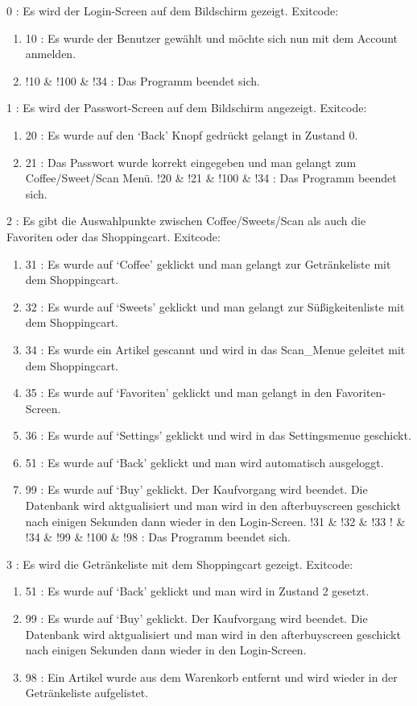 \documentclass[11pt,a4paper]{article} %
\begin{document}
		0 : Es wird der Login-Screen auf dem Bildschirm gezeigt.
			Exitcode: 
\begin{enumerate}
			\item	10 : Es wurde der Benutzer gewählt und möchte sich nun mit dem Account anmelden.
			\item	!10 \& !100 \& !34 : Das Programm beendet sich.
\end{enumerate}
		1 : Es wird der Passwort-Screen auf dem Bildschirm angezeigt.
			Exitcode:
\begin{enumerate}			
			\item	20 : Es wurde auf den `Back' Knopf gedrückt gelangt in Zustand 0.
			\item	21 : Das Passwort wurde korrekt eingegeben und man gelangt zum Coffee/Sweet/Scan Menü.
				!20 \& !21 \& !100 \& !34 : Das Programm beendet sich.
\end{enumerate}			
		2 : Es gibt die Auswahlpunkte zwischen Coffee/Sweets/Scan als auch die Favoriten oder das Shoppingcart.
			Exitcode:
\begin{enumerate}			
			\item	31 : Es wurde auf `Coffee' geklickt und man gelangt zur Getränkeliste mit dem Shoppingcart.
			\item	32 : Es wurde auf `Sweets' geklickt und man gelangt zur Süßigkeitenliste mit dem Shoppingcart.
			\item	34 : Es wurde ein Artikel gescannt und wird in das Scan\_Menue geleitet mit dem Shoppingcart.
			\item	35 : Es wurde auf `Favoriten' geklickt und man gelangt in den Favoriten-Screen.
			\item	36 : Es wurde auf `Settings' geklickt und wird in das Settingsmenue geschickt.
			\item	51 : Es wurde auf `Back' geklickt und man wird automatisch ausgeloggt.
			\item	99 : Es wurde auf `Buy' geklickt. Der Kaufvorgang wird beendet. Die Datenbank wird aktgualisiert und man wird in den afterbuyscreen geschickt nach einigen 						Sekunden dann wieder in den Login-Screen.
				!31 \& !32 \& !33 ! \& !34 \& !99 \& !100 \& !98 : Das Programm beendet sich.
\end{enumerate}			
		3 : Es wird die Getränkeliste mit dem Shoppingcart gezeigt.
			Exitcode:
\begin{enumerate}			
			\item	51 : Es wurde auf `Back' geklickt und man wird in Zustand 2 gesetzt.
			\item	99 : Es wurde auf `Buy' geklickt. Der Kaufvorgang wird beendet. Die Datenbank wird aktgualisiert und man wird in den afterbuyscreen geschickt nach einigen 						Sekunden dann wieder in den Login-Screen.
			\item	98 : Ein Artikel wurde aus dem Warenkorb entfernt und wird wieder in der Getränkeliste aufgelistet.
\end{enumerate}			
\end{document}
